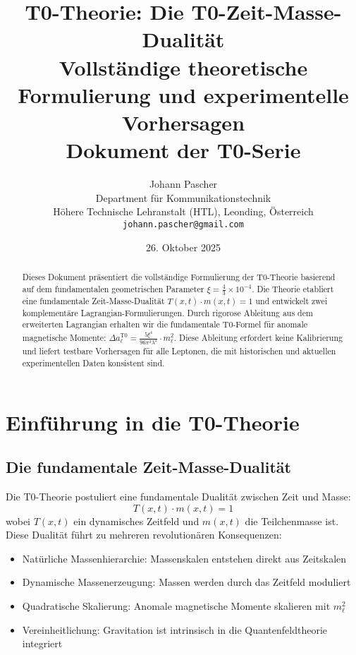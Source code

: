 \documentclass[12pt,a4paper]{article}
\title{\textbf{T0-Theorie: Die T0-Zeit-Masse-Dualität}\\[0.5cm]
	\large Vollständige theoretische Formulierung und experimentelle Vorhersagen\\[0.3cm]
	\normalsize Dokument der T0-Serie}
\author{Johann Pascher\\
	Department für Kommunikationstechnik\\
	Höhere Technische Lehranstalt (HTL), Leonding, Österreich\\
	\texttt{johann.pascher@gmail.com}}
\date{26. Oktober 2025}
\begin{document}
	
	\maketitle
	
	\begin{abstract}
		Dieses Dokument präsentiert die vollständige Formulierung der T0-Theorie basierend auf dem fundamentalen geometrischen Parameter $\xi = \frac{4}{3} \times 10^{-4}$. Die Theorie etabliert eine fundamentale Zeit-Masse-Dualität $T(x,t) \cdot m(x,t) = 1$ und entwickelt zwei komplementäre Lagrangian-Formulierungen. Durch rigorose Ableitung aus dem erweiterten Lagrangian erhalten wir die fundamentale T0-Formel für anomale magnetische Momente: $\Delta a_\ell^{\mathrm{T0}} = \frac{5\xi^4}{96\pi^2\lambda^2} \cdot m_\ell^2$. Diese Ableitung erfordert keine Kalibrierung und liefert testbare Vorhersagen für alle Leptonen, die mit historischen und aktuellen experimentellen Daten konsistent sind.
	\end{abstract}
	
	\tableofcontents
	\newpage
	
	\section{Einführung in die T0-Theorie}
	
	\subsection{Die fundamentale Zeit-Masse-Dualität}
	
	Die T0-Theorie postuliert eine fundamentale Dualität zwischen Zeit und Masse:
	\begin{equation}
		T(x,t) \cdot m(x,t) = 1
	\end{equation}
	wobei $T(x,t)$ ein dynamisches Zeitfeld und $m(x,t)$ die Teilchenmasse ist. Diese Dualität führt zu mehreren revolutionären Konsequenzen:
	
	\begin{itemize}
		\item Natürliche Massenhierarchie: Massenskalen entstehen direkt aus Zeitskalen
		\item Dynamische Massenerzeugung: Massen werden durch das Zeitfeld moduliert
		\item Quadratische Skalierung: Anomale magnetische Momente skalieren mit $m_\ell^2$
		\item Vereinheitlichung: Gravitation ist intrinsisch in die Quantenfeldtheorie integriert
	\end{itemize}
	
\end{document}
